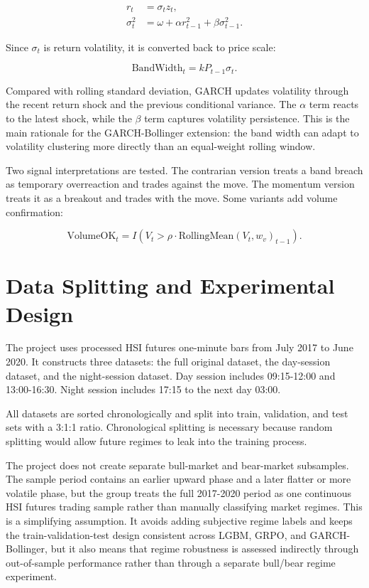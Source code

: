 \documentclass[11pt,a4paper]{article}
\begin{document}
\begin{align}
    r_t &= \sigma_t z_t,\\
    \sigma_t^2 &= \omega + \alpha r_{t-1}^2 + \beta \sigma_{t-1}^2.
\end{align}

Since $\sigma_t$ is return volatility, it is converted back to price scale:

\begin{equation}
    \mathrm{BandWidth}_t = k P_{t-1}\sigma_t.
\end{equation}

Compared with rolling standard deviation, GARCH updates volatility through the recent return shock and the previous conditional variance. The $\alpha$ term reacts to the latest shock, while the $\beta$ term captures volatility persistence. This is the main rationale for the GARCH-Bollinger extension: the band width can adapt to volatility clustering more directly than an equal-weight rolling window.

Two signal interpretations are tested. The contrarian version treats a band breach as temporary overreaction and trades against the move. The momentum version treats it as a breakout and trades with the move. Some variants add volume confirmation:

\begin{equation}
    \mathrm{VolumeOK}_t = I\left(V_t > \rho \cdot \mathrm{RollingMean}(V_t, w_v)_{t-1}\right).
\end{equation}

\section{Data Splitting and Experimental Design}

The project uses processed HSI futures one-minute bars from July 2017 to June 2020. It constructs three datasets: the full original dataset, the day-session dataset, and the night-session dataset. Day session includes 09:15-12:00 and 13:00-16:30. Night session includes 17:15 to the next day 03:00.

All datasets are sorted chronologically and split into train, validation, and test sets with a 3:1:1 ratio. Chronological splitting is necessary because random splitting would allow future regimes to leak into the training process.

The project does not create separate bull-market and bear-market subsamples. The sample period contains an earlier upward phase and a later flatter or more volatile phase, but the group treats the full 2017-2020 period as one continuous HSI futures trading sample rather than manually classifying market regimes. This is a simplifying assumption. It avoids adding subjective regime labels and keeps the train-validation-test design consistent across LGBM, GRPO, and GARCH-Bollinger, but it also means that regime robustness is assessed indirectly through out-of-sample performance rather than through a separate bull/bear regime experiment.
\end{document}
